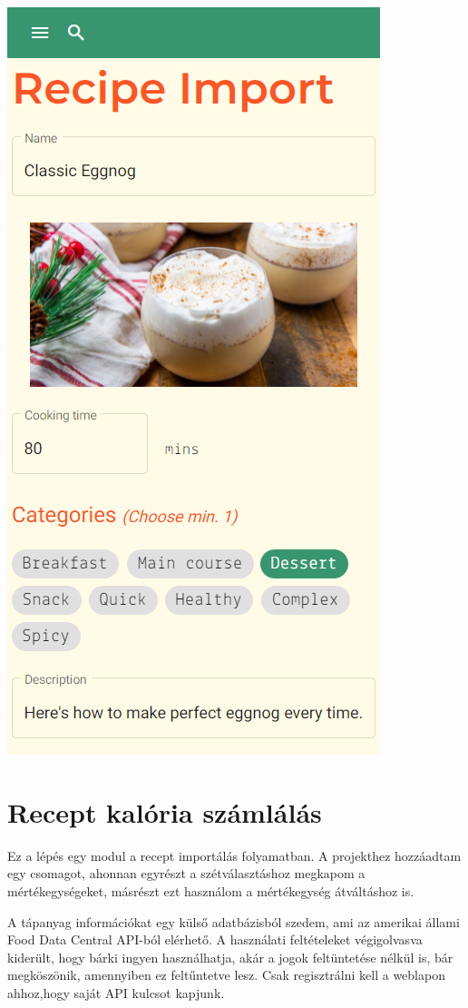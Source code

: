 \documentclass[12pt]{report}
\theoremstyle{definition}
\begin{document}
\includegraphics[scale=0.5]{pictures/mobile_importDataCheck.png}

\section{Recept kalória számlálás}
Ez a lépés egy modul a recept importálás folyamatban. A projekthez hozzáadtam egy csomagot, ahonnan egyrészt a szétválasztáshoz megkapom a mértékegységeket, másrészt ezt használom a mértékegység átváltáshoz is. 

A tápanyag információkat egy külső adatbázisból szedem, ami az amerikai állami  Food Data Central API-ból elérhető. A használati feltételeket végigolvasva kiderült, hogy bárki ingyen használhatja, akár a jogok feltüntetése nélkül is, bár megköszönik, amennyiben ez feltűntetve lesz. Csak regisztrálni kell a weblapon ahhoz,hogy saját API kulcsot kapjunk.
\end{document}
